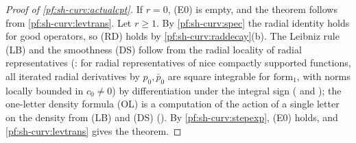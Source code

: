 \begin{proof}[Proof of \cref{pf:sh-curv:actualcpt}]
If $r=0$, (E0) is empty, and the theorem follows from \cref{pf:sh-curv:levtrans}. Let $r\ge1$. By
\cref{pf:sh-curv:spec} the radial identity holds for good operators, so (RD) holds by
\cref{pf:sh-curv:raddecay}(b). The Leibniz rule (LB) and the smoothness (DS) follow from the radial locality of radial
representatives (: for radial representatives of nice
compactly supported functions, all iterated radial derivatives by $p_0,\bar p_0$ are square integrable for $\mathrm{form}_1$,
with norms locally bounded in $c_0\ne0$) by differentiation under the integral sign
( and );
the one-letter density formula (OL) is a computation of the action of a single letter on the density from (LB) and (DS)
(). By \cref{pf:sh-curv:stepexp}, (E0) holds, and
\cref{pf:sh-curv:levtrans} gives the theorem.
\end{proof}
